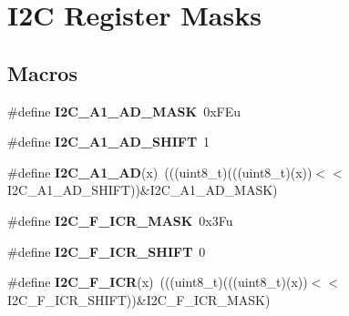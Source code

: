 \hypertarget{group___i2_c___register___masks}{}\section{I2C Register Masks}
\label{group___i2_c___register___masks}
\subsection*{Macros}
\begin{DoxyCompactItemize}
\item 
\mbox{\label{group___i2_c___register___masks_gad90fbd42f33b89ff3296c52700771b1b}} 
\#define {\bfseries I2\+C\+\_\+\+A1\+\_\+\+A\+D\+\_\+\+M\+A\+SK}~0x\+F\+Eu
\item 
\mbox{\label{group___i2_c___register___masks_gaf074658893634b95a9858ee29bbdd88a}} 
\#define {\bfseries I2\+C\+\_\+\+A1\+\_\+\+A\+D\+\_\+\+S\+H\+I\+FT}~1
\item 
\mbox{\label{group___i2_c___register___masks_ga5248771248d1964b566ca3de1cadf6a3}} 
\#define {\bfseries I2\+C\+\_\+\+A1\+\_\+\+AD}(x)~(((uint8\+\_\+t)(((uint8\+\_\+t)(x))$<$$<$I2\+C\+\_\+\+A1\+\_\+\+A\+D\+\_\+\+S\+H\+I\+FT))\&I2\+C\+\_\+\+A1\+\_\+\+A\+D\+\_\+\+M\+A\+SK)
\item 
\mbox{\label{group___i2_c___register___masks_gaeb777a93b5695409902fb2f2b77eb760}} 
\#define {\bfseries I2\+C\+\_\+\+F\+\_\+\+I\+C\+R\+\_\+\+M\+A\+SK}~0x3\+Fu
\item 
\mbox{\label{group___i2_c___register___masks_ga8e2daf0de75e77e33467f6b132be0c30}} 
\#define {\bfseries I2\+C\+\_\+\+F\+\_\+\+I\+C\+R\+\_\+\+S\+H\+I\+FT}~0
\item 
\mbox{\label{group___i2_c___register___masks_ga18089fd1cbe1936b133d50d580d39e6d}} 
\#define {\bfseries I2\+C\+\_\+\+F\+\_\+\+I\+CR}(x)~(((uint8\+\_\+t)(((uint8\+\_\+t)(x))$<$$<$I2\+C\+\_\+\+F\+\_\+\+I\+C\+R\+\_\+\+S\+H\+I\+FT))\&I2\+C\+\_\+\+F\+\_\+\+I\+C\+R\+\_\+\+M\+A\+SK)
\item 
\mbox{\label{group___i2_c___register___masks_ga9e077caa9ac07c03f5e34e431d0806fa}} 

\end{DoxyCompactItemize}
